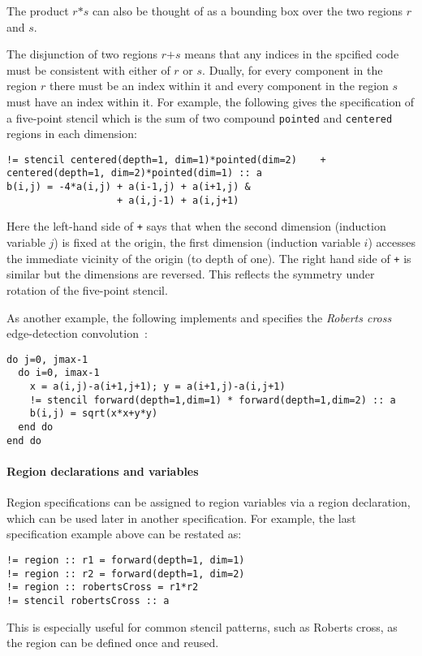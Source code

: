 \documentclass[10pt,preprint]{sigplanconf}
\theoremstyle{definition}
\newcommand{\term}[1]{\texttt{#1}}
\begin{document}
The product $r \term{*} s$ can also be thought of as a bounding box
over the two regions $r$ and $s$.

The disjunction of two regions $r \term{+} s$ means that any indices
in the spcified code must be consistent with either of $r$ or $s$.
Dually, for every component in the region $r$ there must be an index
within it and every component in the region $s$ must have an index
within it. For
example, the following gives the specification of a five-point
stencil which is the sum of two compound \texttt{pointed} and
\texttt{centered} regions in each dimension:
%
\begin{verbatim}
!= stencil centered(depth=1, dim=1)*pointed(dim=2)    + centered(depth=1, dim=2)*pointed(dim=1) :: a
b(i,j) = -4*a(i,j) + a(i-1,j) + a(i+1,j) &
                   + a(i,j-1) + a(i,j+1)
\end{verbatim}
Here the left-hand side of \texttt{+} says that when the second dimension
(induction variable $j$) is fixed at the origin, the first dimension
(induction variable $i$) accesses the immediate vicinity of the origin
(to depth of one). The right hand side of \texttt{+} is similar but the dimensions are reversed.
This reflects the symmetry under rotation of the five-point stencil.

As another example, the following
implements and specifies the \emph{Roberts cross}
edge-detection convolution~\cite{davis1975survey}:
\begin{verbatim}
do j=0, jmax-1
  do i=0, imax-1
    x = a(i,j)-a(i+1,j+1); y = a(i+1,j)-a(i,j+1)
    != stencil forward(depth=1,dim=1) * forward(depth=1,dim=2) :: a
    b(i,j) = sqrt(x*x+y*y)
  end do
end do
\end{verbatim}

\paragraph{Region declarations and variables}

Region specifications can be assigned to region variables via
a region declaration, which can be used later in another
specification. For example, the last specification
 example above can be restated as:
\begin{verbatim}
!= region :: r1 = forward(depth=1, dim=1)
!= region :: r2 = forward(depth=1, dim=2)
!= region :: robertsCross = r1*r2
!= stencil robertsCross :: a
\end{verbatim}
This is especially useful for common stencil patterns, such as Roberts cross,
as the region can be defined once and reused.
\end{document}

